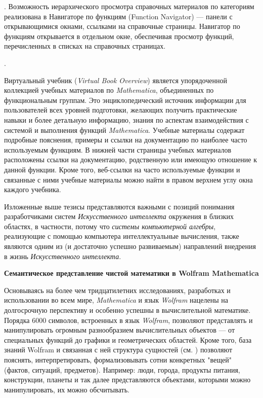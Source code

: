 . Возможность иерархического просмотра справочных материалов по категориям реализована в Навигаторе по функциям (Function Navigator) --- панели с открывающимися окнами, ссылками на справочные страницы. Навигатор по функциям открывается в отдельном окне, обеспечивая просмотр функций, перечисленных в списках на справочных страницах.

. 

Виртуальный учебник (\textit{Virtual Book Overview}) является упорядоченной коллекцией учебных материалов по \textit{Mathematica}, объединенных по функциональным группам. Это энциклопедический источник информации для пользователей всех уровней подготовки, желающих получить практические навыки и более детальную информацию, знания по аспектам взаимодействия с системой и выполнения функций \textit{Mathematica}.
Учебные материалы содержат подробные пояснения, примеры и ссылки на документацию по наиболее часто используемым функциям. В нижней части страницы учебных материалов расположены ссылки на документацию, родственную или имеющую отношение к данной функции. Кроме того, веб-ссылки на часто используемые функции и связанные с ними учебные материалы можно найти в правом верхнем углу окна каждого учебника.

Изложенные выше тезисы представляются важными с позиций понимания разработчиками систем \textit{Искусственного интеллекта} окружения в близких областях, в частности, потому что \textit{системы компьютерной алгебры}, реализующие с помощью компьютера интеллектуальные вычисления, также являются одним из (и достаточно успешно развиваемым) направлений внедрения в жизнь \textit{Искусственного интеллекта}.

\textbf{Семантическое представление чистой математики в Wolfram Mathematica}


Основываясь на более чем тридцатилетних исследованиях, разработках и использовании во всем мире, \textit{Mathematica} и язык \textit{Wolfram} нацелены на долгосрочную перспективу и особенно успешны в вычислительной математике. Порядка 6000 символов, встроенных в язык \textit{Wolfram}, позволяют представлять и манипулировать огромным разнообразием вычислительных объектов --- от специальных функций до графики и геометрических областей. Кроме того, база знаний Wolfram и связанная с ней структура сущностей (см. ) позволяют пояснять, интерпретировать, формализовывать сотни конкретных "вещей"{} (фактов, ситуаций, предметов). Например: люди, города, продукты питания, конструкции, планеты и так далее представляются объектами, которыми можно манипулировать, их можно обсчитывать.


